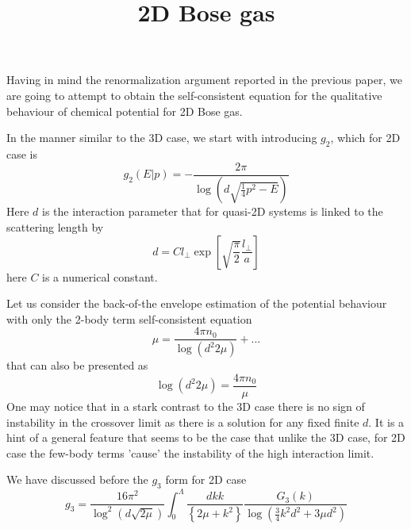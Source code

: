 \documentclass[8pt,letterpaper,notitlepage]{article}
\begin{document}
\title{2D Bose gas}
\maketitle
Having in mind the renormalization argument reported in the previous paper, we are going to attempt to obtain the self-consistent equation for the qualitative behaviour of chemical potential for 2D Bose gas.

In the manner similar to the 3D case, we start with introducing  $g_2$, which for 2D case is 
\begin{equation}
g_2(E| p) = - \frac{2 \pi}{\log \left( d \sqrt{ \frac{1}{4} p^2 - E} \right) } 
\end{equation}
Here $d$ is the interaction parameter that for quasi-2D systems is linked to the scattering length by
\[
d = C l_{\perp} \exp \left[ \sqrt{\frac{\pi}{2}} \frac{l_{\perp}}{a} \right]
\]
here $C$ is a numerical constant.


Let us consider the back-of-the envelope estimation of the potential behaviour with only the 2-body term self-consistent equation
\begin{equation}
\mu = \frac{4 \pi n_0}{\log (d^2 2 \mu)} + ...
\end{equation}
that can also be presented as
\begin{equation}
\log (d^2 2 \mu) = \frac{4 \pi n_0}{\mu}
\end{equation}
One may notice that in a stark contrast to the 3D case there is no sign of instability in the crossover limit as there is a solution for any fixed finite $d$. It is a hint of a general feature that seems to be the case that unlike the 3D case, for 2D case the few-body terms 'cause' the instability of the high interaction limit.
 
We have discussed before the
$g_3$ form for 2D case
\[
g_3 = \frac{16 \pi^2}{\log^2 ( d \sqrt{2 \mu} )}
\int_0^{\Lambda} \frac{dk k}{\left\{ 2 \mu + k^2 \right\}} \frac{G_3(k)}
{\log \left(\frac{3}{4} k^2 d^2  + 3 \mu d^2 \right)}
\]
\end{document}
